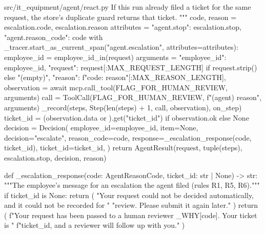 \documentclass[11pt,letterpaper]{article}
\renewcommand{\_}{\textunderscore\allowbreak}
\begin{document}
\begin{codebox}{src/it_equipment/agent/react.py}
    If this run already filed a ticket for the same request, the store's duplicate guard
    returns that ticket.
    """
    code, reason = escalation.code, escalation.reason
    attributes = {"agent.stop": escalation.stop, "agent.reason_code": code}
    with _tracer.start_as_current_span("agent.escalation", attributes=attributes):
        employee_id = employee_id_in(request)
        arguments = {
            "employee_id": employee_id,
            "request": request[:MAX_REQUEST_LENGTH] if request.strip() else "(empty)",
            "reason": f"{code}: {reason}"[:MAX_REASON_LENGTH],
        }
        observation = await mcp.call_tool(FLAG_FOR_HUMAN_REVIEW, arguments)
    call = ToolCall(FLAG_FOR_HUMAN_REVIEW, f"(agent) {reason}", arguments)
    _record(steps, Step(len(steps) + 1, call, observation), on_step)
    ticket_id = (observation.data or {}).get("ticket_id") if observation.ok else None
    decision = Decision(
        employee_id=employee_id,
        item=None,
        decision="escalate",
        reason_code=code,
        response=_escalation_response(code, ticket_id),
        ticket_id=ticket_id,
    )
    return AgentResult(request, tuple(steps), escalation.stop, decision, reason)


def _escalation_response(code: AgentReasonCode, ticket_id: str | None) -> str:
    """The employee's message for an escalation the agent filed (rules R1, R5, R6)."""
    if ticket_id is None:
        return (
            "Your request could not be decided automatically, and it could not be recorded for "
            "review. Please submit it again later."
        )
    return (
        f"Your request has been passed to a human reviewer {_WHY[code]}. Your ticket is "
        f"{ticket_id}, and a reviewer will follow up with you."
    )
\end{codebox}
\end{document}
